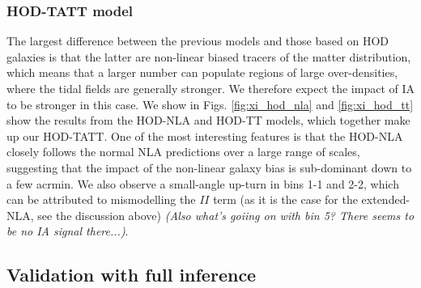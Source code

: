 \subsubsection*{HOD-TATT model}
\label{subsec:HOD}







The largest difference between the previous models and those based on HOD galaxies is that the latter are non-linear biased tracers of the matter distribution, which means that a larger number can populate regions of large over-densities, where the tidal fields are generally stronger. We therefore expect the impact of IA to be stronger in this case. We show in Figs. \ref{fig:xi_hod_nla} and \ref{fig:xi_hod_tt} show the results from the HOD-NLA  and HOD-TT models, which together make up our HOD-TATT. One of the most interesting features is that the HOD-NLA closely follows the normal NLA predictions over a large range of scales, suggesting that the impact of the non-linear galaxy bias is sub-dominant down to a few acrmin. We also observe a small-angle up-turn in bins 1-1 and 2-2, which can be attributed to mismodelling the $II$ term (as it is the case for the extended-NLA, see the discussion above) {\it (Also what's goiing on with bin 5? There seems to be no IA signal there...)}. 



\subsection{Validation with full inference}
 \label{sec:inference}
 
 
 





 

